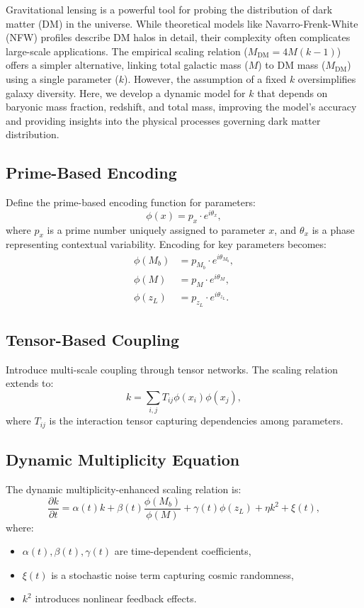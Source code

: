 \documentclass[12]{amsart}
\theoremstyle{plain}
\begin{document}
Gravitational lensing is a powerful tool for probing the distribution of dark matter (DM) in the universe. While theoretical models like Navarro-Frenk-White (NFW) profiles describe DM halos in detail, their complexity often complicates large-scale applications. The empirical scaling relation ($M_{\text{DM}} = 4M(k - 1)$) offers a simpler alternative, linking total galactic mass ($M$) to DM mass ($M_{\text{DM}}$) using a single parameter ($k$). However, the assumption of a fixed $k$ oversimplifies galaxy diversity. Here, we develop a dynamic model for $k$ that depends on baryonic mass fraction, redshift, and total mass, improving the model's accuracy and providing insights into the physical processes governing dark matter distribution.

\subsection{Prime-Based Encoding}
Define the prime-based encoding function for parameters:
\begin{equation}
    \phi(x) = p_x \cdot e^{i\theta_x},
\end{equation}
where $p_x$ is a prime number uniquely assigned to parameter $x$, and $\theta_x$ is a phase representing contextual variability. Encoding for key parameters becomes:
\begin{align}
    \phi(M_b) &= p_{M_b} \cdot e^{i\theta_{M_b}}, \\
    \phi(M) &= p_M \cdot e^{i\theta_M}, \\
    \phi(z_L) &= p_{z_L} \cdot e^{i\theta_{z_L}}.
\end{align}

\subsection{Tensor-Based Coupling}
Introduce multi-scale coupling through tensor networks. The scaling relation extends to:
\begin{equation}
    k = \sum_{i,j} T_{ij} \phi(x_i) \phi(x_j),
\end{equation}
where $T_{ij}$ is the interaction tensor capturing dependencies among parameters.

\subsection{Dynamic Multiplicity Equation}
The dynamic multiplicity-enhanced scaling relation is:
\begin{equation}
    \frac{\partial k}{\partial t} = \alpha(t) k + \beta(t) \frac{\phi(M_b)}{\phi(M)} + \gamma(t) \phi(z_L) + \eta k^2 + \xi(t),
\end{equation}
where:
\begin{itemize}
    \item $\alpha(t), \beta(t), \gamma(t)$ are time-dependent coefficients,
    \item $\xi(t)$ is a stochastic noise term capturing cosmic randomness,
    \item $k^2$ introduces nonlinear feedback effects.
\end{itemize}
\end{document}
